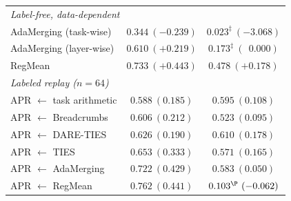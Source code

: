 \documentclass[11pt]{article}
\begin{document}
\begin{table}[t]
\begin{tabular}{lcc}
\midrule
\multicolumn{3}{l}{\emph{Label-free, data-dependent}}\\
AdaMerging (task-wise)                    & $0.344\ (-0.239)$          & $0.023^\ddagger\ (-3.068)$ \\
AdaMerging (layer-wise)                   & $0.610\ (+0.219)$          & $0.173^\ddagger\ (\ \ 0.000)$ \\
RegMean                                   & $0.733\ (+0.443)$          & $0.478\ (+0.178)$ \\
\midrule
\multicolumn{3}{l}{\emph{Labeled replay ($n=64$)}}\\
APR $\leftarrow$ task arithmetic          & $0.588\ (0.185)$           & $0.595\ (0.108)$ \\
APR $\leftarrow$ Breadcrumbs              & $0.606\ (0.212)$           & $0.523\ (0.095)$ \\
APR $\leftarrow$ DARE-TIES                & $0.626\ (0.190)$           & $\mathbf{0.610}\ (\mathbf{0.178})$ \\
APR $\leftarrow$ TIES                     & $0.653\ (0.333)$           & $0.571\ (0.165)$ \\
APR $\leftarrow$ AdaMerging               & $\mathbf{0.722}\ (\mathbf{0.429})$ & $0.583\ (0.050)$ \\
APR $\leftarrow$ RegMean                  & $0.762\ (0.441)$           & $0.103^\P\ (-0.062)$ \\
\bottomrule
\end{tabular}
\end{table}
\end{document}
